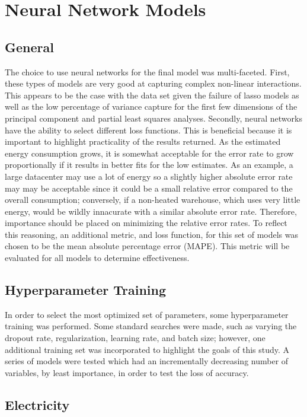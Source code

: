 
\section{Neural Network Models}
\label{sec:nn_models}

\subsection{General}
The choice to use neural networks for the final model was multi-faceted.  First, these types of models are very good at capturing complex non-linear interactions.  This appears to be the case with the data set given the failure of lasso models as well as the low percentage of variance capture for the first few dimensions of the principal component and partial least squares analyses.  Secondly, neural networks have the ability to select different loss functions.  This is beneficial because it is important to highlight practicality of the results returned.  As the estimated energy consumption grows, it is somewhat acceptable for the error rate to grow proportionally if it results in better fits for the low estimates.  As an example, a large datacenter may use a lot of energy so a slightly higher absolute error rate may may be acceptable since it could be a small relative error compared to the overall consumption; conversely, if a non-heated warehouse, which uses very little energy, would be wildly innacurate with a similar absolute error rate.  Therefore, importance should be placed on minimizing the relative error rates.  To reflect this reasoning, an additional metric, and loss function, for this set of models was chosen to be the mean absolute percentage error (MAPE).  This metric will be evaluated for all models to determine effectiveness.

\subsection{Hyperparameter Training}
In order to select the most optimized set of parameters, some hyperparameter training was performed.  Some standard searches were made, such as varying the dropout rate, regularization, learning rate, and batch size; however, one additional training set was incorporated to highlight the goals of this study.  A series of models were tested which had an incrementally decreasing number of variables, by least importance, in order to test the loss of accuracy.

\subsection{Electricity}
